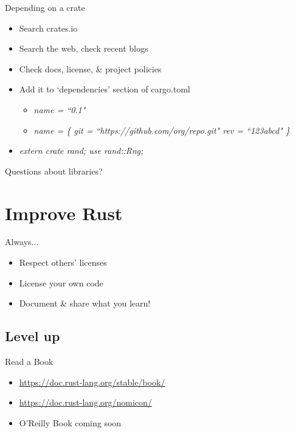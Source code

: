 \documentclass[100pt]{beamer}
\begin{document}
\begin{frame}[fragile]
    Depending on a crate
    \begin{itemize}
        \item Search crates.io
        \item Search the web, check recent blogs
        \item Check docs, license, \& project policies
        \item Add it to `dependencies' section of cargo.toml
        \begin{itemize}
            \item \textit{ name = ``0.1" }
            \item \textit{ name = \{ git = ``https://github.com/org/repo.git" rev = ``123abcd" \} }
        \end{itemize}
        \item \textit{ extern crate rand; use rand::Rng; }
    \end{itemize}
\end{frame}

\begin{frame}
    Questions about libraries?
\end{frame}

\section{Improve Rust}

\begin{frame}
    Always...
    \begin{itemize}
        \item Respect others' licenses
        \item License your own code
        \item Document \& share what you learn!
    \end{itemize}
\end{frame}


\subsection{Level up}

\begin{frame}
    Read a Book
    \begin{itemize}
        \item \url{https://doc.rust-lang.org/stable/book/}
        \item \url{https://doc.rust-lang.org/nomicon/}
        \item O'Reilly Book coming soon
    \end{itemize}
\end{frame}
\end{document}
